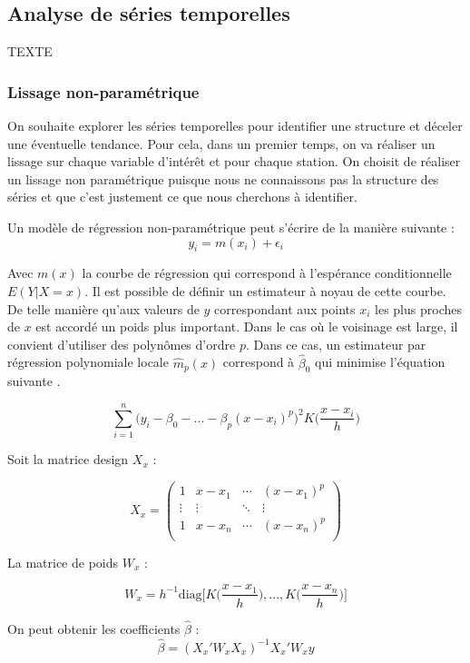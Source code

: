 \documentclass[12pt]{article}
\begin{document}
\subsection{Analyse de séries temporelles}

TEXTE

\subsubsection{Lissage non-paramétrique}

On souhaite explorer les séries temporelles pour identifier une structure et déceler une éventuelle tendance. Pour cela, dans un premier temps, on va réaliser un lissage sur chaque variable d’intérêt et pour chaque station. 
On choisit de réaliser un lissage non paramétrique puisque nous ne connaissons pas la structure des séries et que c’est justement ce que nous cherchons à identifier.

Un modèle de régression non-paramétrique peut s'écrire de la manière suivante : 
\[y_i=m(x_i) + \epsilon_i\]

Avec $m(x)$ la courbe de régression qui correspond à l'espérance conditionnelle $E(Y|X=x)$. Il est possible de définir un estimateur à noyau de cette courbe. De telle manière qu’aux valeurs de $y$ correspondant aux points $x_i$ les plus proches de $x$ est accordé un poids plus important. Dans le cas où le voisinage est large, il convient d'utiliser des polynômes d’ordre $p$. Dans ce cas, un estimateur par régression polynomiale locale $\hat{m}_p(x)$ correspond à  $\hat{\beta}_0$ qui minimise l’équation suivante \citep{Simonoff1996}.

\[\sum_{i=1}^n\big(y_i-\beta_0-...-\beta_p(x-x_i)^p\big)^2K\Big(\frac{x-x_i}{h}\Big)\]

Soit la matrice design $X_x$ : 

\[X_x=
\begin{pmatrix}1 & x-x_1 & \cdots & (x-x_1)^p\\
\vdots & \vdots & \ddots &\vdots \\
1 & x-x_n & \cdots & (x-x_n)^p\\ 
\end{pmatrix}\]

La matrice de poids $W_x$ : 

\[W_x=h^{-1}\text{diag}\bigg\lbrack K\Big(\frac{x-x_1}{h}\Big), ... , K\Big(\frac{x-x_n}{h}\Big)\bigg\rbrack\]

On peut obtenir les coefficients $\hat\beta$ :
\[\hat\beta=(X_x'W_xX_x)^{-1}X_x'W_xy\]
\end{document}
